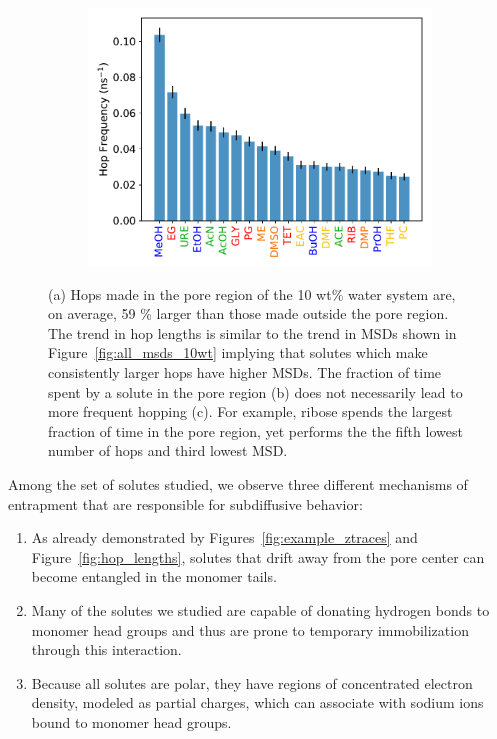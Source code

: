 \documentclass{article}
\begin{document}
\begin{figure}[!htb]
\begin{subfigure}{0.325\textwidth}
  \includegraphics[width=\textwidth]{hopfreq_total.pdf}
  \caption{}\label{fig:hopfreq}
  \end{subfigure}
  \caption{(a) Hops made in the pore region of the 10 wt\% water system
  are, on average, 59 \% larger than those made outside the pore region.
  The trend in hop lengths is similar to the trend in MSDs shown in
  Figure~\ref{fig:all_msds_10wt} implying that solutes which make consistently
  larger hops have higher MSDs. The fraction of time spent by a solute in the
  pore region (b) does not necessarily lead to more frequent hopping (c). For
  example, ribose spends the largest fraction of time in the pore region, yet
  performs the the fifth lowest number of hops and third lowest MSD.}\label{fig:hops}
  \end{figure}
  
  Among the set of solutes studied, we observe three different mechanisms 
  of entrapment that are responsible for subdiffusive behavior:
  \begin{enumerate}
    \item As already demonstrated by Figures~\ref{fig:example_ztraces} and 
    Figure~\ref{fig:hop_lengths}, solutes that drift away from the pore center
    can become entangled in the monomer tails. 
    \item Many of the solutes we studied are capable of donating hydrogen bonds to
    monomer head groups and thus are prone to temporary immobilization through 
    this interaction.
    \item Because all solutes are polar, they have regions of concentrated electron
    density, modeled as partial charges, which can associate with sodium ions
    bound to monomer head groups.
  \end{enumerate}
  
\end{document}
